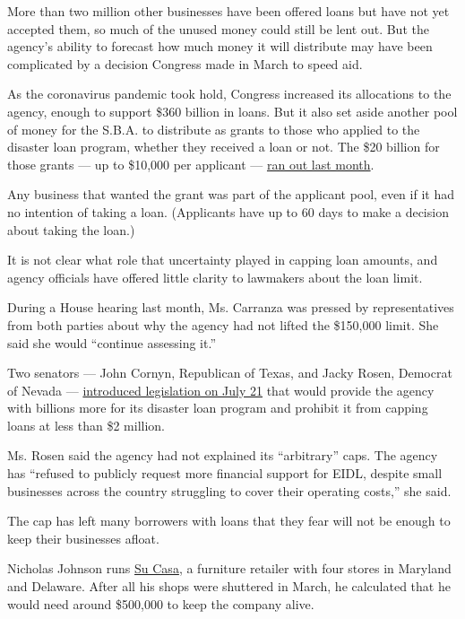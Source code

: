 More than two million other businesses have been offered loans but have
not yet accepted them, so much of the unused money could still be lent
out. But the agency's ability to forecast how much money it will
distribute may have been complicated by a decision Congress made in
March to speed aid.

As the coronavirus pandemic took hold, Congress increased its
allocations to the agency, enough to support \$360 billion in loans. But
it also set aside another pool of money for the S.B.A. to distribute as
grants to those who applied to the disaster loan program, whether they
received a loan or not. The \$20 billion for those grants --- up to
\$10,000 per applicant ---
\href{https://www.sba.gov/about-sba/sba-newsroom/press-releases-media-advisories/sba-provided-20-billion-small-businesses-and-non-profits-through-economic-injury-disaster-loan}{ran
out last month}.

Any business that wanted the grant was part of the applicant pool, even
if it had no intention of taking a loan. (Applicants have up to 60 days
to make a decision about taking the loan.)

It is not clear what role that uncertainty played in capping loan
amounts, and agency officials have offered little clarity to lawmakers
about the loan limit.

During a House hearing last month, Ms. Carranza was pressed by
representatives from both parties about why the agency had not lifted
the \$150,000 limit. She said she would ``continue assessing it.''

Two senators --- John Cornyn, Republican of Texas, and Jacky Rosen,
Democrat of Nevada ---
\href{https://www.cornyn.senate.gov/content/news/cornyn-introduces-bipartisan-legislation-provide-increased-eidl-loans-and-eidl-advance}{introduced
legislation on July 21} that would provide the agency with billions more
for its disaster loan program and prohibit it from capping loans at less
than \$2 million.

Ms. Rosen said the agency had not explained its ``arbitrary'' caps. The
agency has ``refused to publicly request more financial support for
EIDL, despite small businesses across the country struggling to cover
their operating costs,'' she said.

The cap has left many borrowers with loans that they fear will not be
enough to keep their businesses afloat.

Nicholas Johnson runs \href{http://sucasa-furniture.com/}{Su Casa}, a
furniture retailer with four stores in Maryland and Delaware. After all
his shops were shuttered in March, he calculated that he would need
around \$500,000 to keep the company alive.

